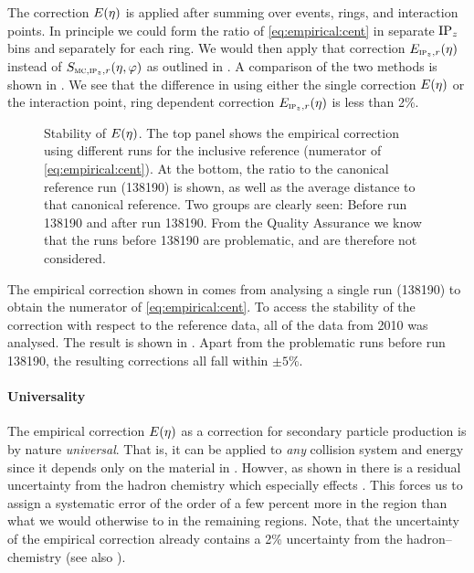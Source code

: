 The correction $\EmpCor$ is applied after summing over events, rings,
and interaction points.  In principle we could form the ratio of
\eqref{eq:empirical:cent} in separate $\IPz$ bins and separately for
each \FMD{} ring.  We would then apply that correction
$\EmpCor[\subIPz,r]{}$ instead of $\SecMap$ as outlined in
.  A comparison of the two methods is shown
in .  We see that the difference in
using either the single correction $\EmpCor$ or the interaction point,
ring dependent correction $\EmpCor[\subIPz,r]{}$ is less than 2\%.

\begin{figure}[h!tbp]
  \centering
  \caption{Stability of $\EmpCor$. The top panel shows the empirical
    correction using different runs for the inclusive reference
    (numerator of \eqref{eq:empirical:cent}). At the bottom, the ratio
    to the canonical reference run (138190) is shown, as well as the
    average distance to that canonical reference. Two groups are
    clearly seen: Before run 138190 and after run 138190.  From the
    Quality Assurance we know that the runs before 138190 are
    problematic, and are therefore not considered. }
  \label{fig:empirical:empcor_stable}
\end{figure}

The empirical correction shown in  comes
from analysing a single run (138190) to obtain the numerator of
\eqref{eq:empirical:cent}.  To access the stability of the correction
with respect to the reference data, all of the \PbPbCol{} data from
2010 was analysed.  The result is shown in
.  Apart from the problematic runs
before run 138190, the resulting corrections all fall within
$\pm5\%$. 


\paragraph{Universality} The empirical correction $\EmpCor$ as a
correction for secondary particle production is by nature
\emph{universal}.  That is, it can be applied to \emph{any} collision
system and energy since it depends only on the material in \ALICE{}.
Howver, as shown in  there is a residual
uncertainty from the hadron chemistry which especially effects
.  This forces us to assign a systematic error of the order of
a few percent more in the  region than what we would otherwise
to in the remaining regions.  Note, that the uncertainty of the
empirical correction already contains a 2\% uncertainty from the
hadron--chemistry (see also ).

